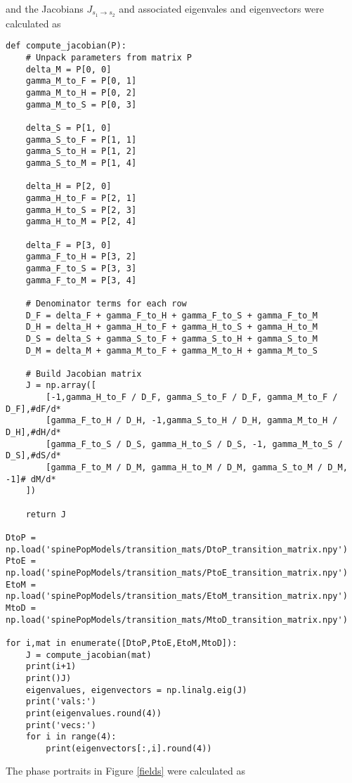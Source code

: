 \documentclass[11pt]{article}
\begin{document}
and the Jacobians $J_{s_1\to s_2}$ and associated eigenvales and eigenvectors were calculated as
\begin{Verbatim}[frame=single]
def compute_jacobian(P):
    # Unpack parameters from matrix P
    delta_M = P[0, 0]
    gamma_M_to_F = P[0, 1]
    gamma_M_to_H = P[0, 2]
    gamma_M_to_S = P[0, 3]

    delta_S = P[1, 0]
    gamma_S_to_F = P[1, 1]
    gamma_S_to_H = P[1, 2]
    gamma_S_to_M = P[1, 4]

    delta_H = P[2, 0]
    gamma_H_to_F = P[2, 1]
    gamma_H_to_S = P[2, 3]
    gamma_H_to_M = P[2, 4]

    delta_F = P[3, 0]
    gamma_F_to_H = P[3, 2]
    gamma_F_to_S = P[3, 3]
    gamma_F_to_M = P[3, 4]

    # Denominator terms for each row
    D_F = delta_F + gamma_F_to_H + gamma_F_to_S + gamma_F_to_M
    D_H = delta_H + gamma_H_to_F + gamma_H_to_S + gamma_H_to_M
    D_S = delta_S + gamma_S_to_F + gamma_S_to_H + gamma_S_to_M
    D_M = delta_M + gamma_M_to_F + gamma_M_to_H + gamma_M_to_S

    # Build Jacobian matrix
    J = np.array([
        [-1,gamma_H_to_F / D_F, gamma_S_to_F / D_F, gamma_M_to_F / D_F],#dF/d*
        [gamma_F_to_H / D_H, -1,gamma_S_to_H / D_H, gamma_M_to_H / D_H],#dH/d*
        [gamma_F_to_S / D_S, gamma_H_to_S / D_S, -1, gamma_M_to_S / D_S],#dS/d*
        [gamma_F_to_M / D_M, gamma_H_to_M / D_M, gamma_S_to_M / D_M, -1]# dM/d*
    ])

    return J
    
DtoP = np.load('spinePopModels/transition_mats/DtoP_transition_matrix.npy')
PtoE = np.load('spinePopModels/transition_mats/PtoE_transition_matrix.npy')
EtoM = np.load('spinePopModels/transition_mats/EtoM_transition_matrix.npy')
MtoD = np.load('spinePopModels/transition_mats/MtoD_transition_matrix.npy')

for i,mat in enumerate([DtoP,PtoE,EtoM,MtoD]):
    J = compute_jacobian(mat)
    print(i+1)
    print()J)
    eigenvalues, eigenvectors = np.linalg.eig(J)
    print('vals:')
    print(eigenvalues.round(4))
    print('vecs:')
    for i in range(4):
        print(eigenvectors[:,i].round(4))
\end{Verbatim}
The phase portraits in Figure \ref{fields} were calculated as
\end{document}
